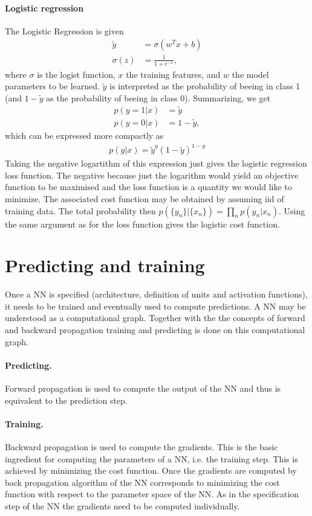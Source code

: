 \documentclass[12pt,a4paper]{article}
\begin{document}
\paragraph*{Logistic regression}
The Logistic Regression is given
\begin{align}
\tilde y &= \sigma(w^T x + b) \\
\sigma(z) &= \frac{1}{1+e^{-x}}, 
\end{align}
where $\sigma$ is the logist function, $x$ the training features, and $w$ the model parameters to be learned. $\tilde y$ is interpreted as the probability of beeing in class 1 (and $1 - \tilde y$ as the probability of beeing in class 0). Summarizing, we get
\begin{align}
p(y=1 | x) &= \tilde y \\
p(y=0 | x) &= 1 - \tilde y,
\end{align} 
which can be expressed more compactly as
\begin{align}
p(y|x) = \tilde y ^y (1-\tilde y)^{1-y}
\end{align}
Taking the negative logartithm of this expression just gives the logistic regression loss function. The negative because just the logarithm would yield an objective function to be maximised and the loss function is a quantity we would like to minimize. The associated cost function may be obtained by assuming iid of training data. The total probability then $p(\{y_n\}|\{x_n\}) = \prod_n p(y_n|x_n)$. Using the same argument as for the loss function gives the logistic cost function.
\section{Predicting and training}
Once a NN is specified (architecture, definition of units and activation functions), it needs to be trained and eventually used to compute predictions. A NN may be understood as a computational graph. Together with the the concepts of forward and backward propagation training and predicting is done on this computational graph. 
\paragraph{Predicting.}
Forward propagation is used to compute the output of the NN and thus is equivalent to the prediction step.
\paragraph{Training.} Backward propagation is used to compute the gradients. This is the basic ingredient for computing the parameters of a NN, i.e. the training step. This is achieved by minimizing the cost function. Once the gradients are computed by back propagation algorithm \cite{Rumelhart:backpropagation} of the NN corresponds to minimizing the cost function with respect to the parameter space of the NN.
As in the specification step of the NN the gradients need to be computed individually.
\end{document}
